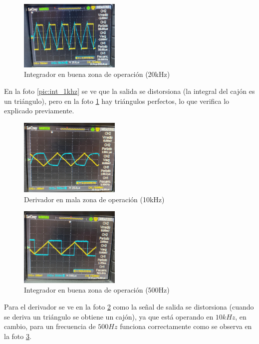 \documentclass[letterpaper, 10 pt, conference]{ieeeconf}  %
\begin{document}
\begin{figure}[H]
  \centering
  \includegraphics[width=0.43\textwidth]{./Imagenes/integrador_20khz.jpeg}
  \caption{Integrador en buena zona de operación (20kHz)}
  \label{pic:int_20khz}
\end{figure}

En la foto \ref{pic:int_1khz} se ve que la salida se distorsiona (la integral del cajón es un triángulo), pero en la foto \ref{pic:int_20khz} hay triángulos perfectos, lo que verifica lo explicado previamente.


\begin{figure}[H]
  \centering
  \includegraphics[width=0.43\textwidth]{./Imagenes/derivador_10khz.jpeg}
  \caption{Derivador en mala zona de operación (10kHz)}
  \label{pic:der_10khz}
\end{figure}

\begin{figure}[H]
  \centering
  \includegraphics[width=0.43\textwidth]{./Imagenes/derivador_500hz.jpeg}
  \caption{Integrador en buena zona de operación (500Hz)}
  \label{pic:der_500hz}
\end{figure}

Para el derivador se ve en la foto \ref{pic:der_10khz} como la señal de salida se distorsiona (cuando se deriva un triángulo se obtiene un cajón), ya que está operando en $10kHz$, en cambio, para un frecuencia de $500Hz$ funciona correctamente como se observa en la foto \ref{pic:der_500hz}.
\end{document}
